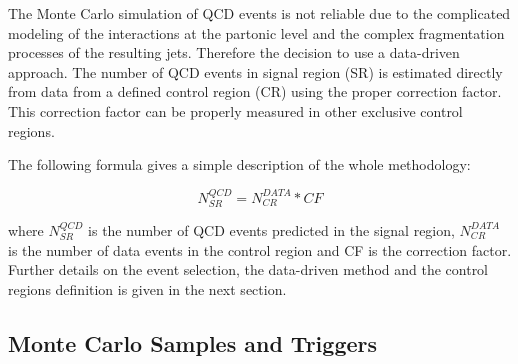 The Monte Carlo simulation of QCD events is not reliable due to the complicated modeling of the interactions at the partonic level and the complex fragmentation processes of the resulting jets. Therefore the decision to use a data-driven approach. The number of QCD events in signal region (SR) is estimated directly from data from a defined control region (CR) using the proper correction factor. This correction factor can be properly measured in other exclusive control regions. 

The following formula gives a simple description of the whole methodology:

\begin{equation}
N^{QCD}_{SR} =  N^{DATA}_{CR} * CF
\label{eq:qcdbgpred_simple}
\end{equation} 

where $N^{QCD}_{SR}$ is the number of QCD events predicted in the signal region, $N^{DATA}_{CR}$ is the number of data events in the control region and CF is the correction factor. Further details on the event selection, the data-driven method and the control regions definition is given in the next section.

\clearpage
\subsection{Monte Carlo Samples and Triggers}

\begin{table}[ht]
	\caption{ List of the required trigger paths.}
	\label{teble:triggers} %
\end{table}

